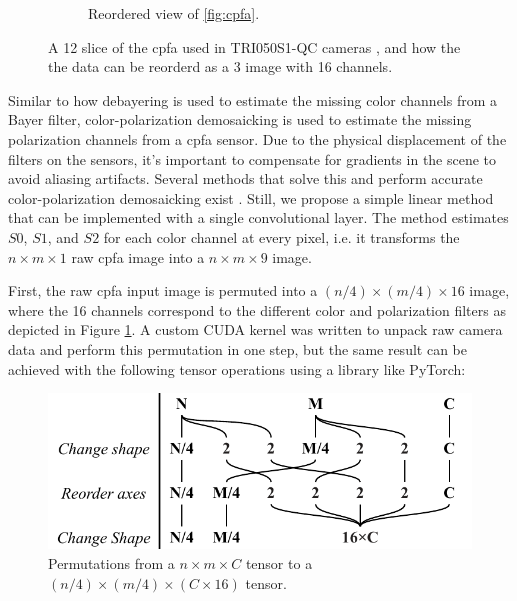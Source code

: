 \begin{figure}[H]
\begin{subfigure}[B]{.48\textwidth}
        \caption{Reordered view of \ref{fig:cpfa}. \label{fig:cpfa_reorder}}
    \end{subfigure}
    \caption{A 12 slice of the \gls{cpfa} used in TRI050S1-QC cameras \cite{lucidvisionlabsTritonMPPolarized2020}, and how the the data can be reorderd as a 3 image with 16 channels. \label{fig:polarization_sensor}}
\end{figure}%

\pagebreak
Similar to how debayering is used to estimate the missing color channels from a Bayer filter, color-polarization demosaicking is used to estimate the missing polarization channels from a \gls{cpfa} sensor.
Due to the physical displacement of the filters on the sensors, it's important to compensate for gradients in the scene to avoid aliasing artifacts.
Several methods that solve this and perform accurate color-polarization demosaicking exist \cite{morimatsuMonochromeColorPolarization2020}\cite{morimatsuMonochromeColorPolarization2021}\cite{nguyenTwoStepColorPolarizationDemosaicking2022a}.
Still, we propose a simple linear method that can be implemented with a single convolutional layer.
The method estimates $S0$, $S1$, and $S2$ for each color channel at every pixel, i.e. it transforms the $n \times m \times 1$ raw \gls{cpfa} image into a $n \times m \times 9$ image.

First, the raw \gls{cpfa} input image is permuted into a $(n/4) \times (m/4) \times 16$ image, where the 16 channels correspond to the different color and polarization filters as depicted in Figure \ref{fig:cpfa_reorder}.
A custom CUDA kernel was written to unpack raw camera data and perform this permutation in one step, but the same result can be achieved with the following tensor operations using a library like PyTorch:
\begin{figure}[H]
    \centering
    \includegraphics[width=.6\textwidth]{figures/transformation.pdf}
    \caption{Permutations from a $n \times m \times C $ tensor to a $(n/4) \times (m/4) \times (C\times 16)$ tensor. \label{fig:reorder_operations}}
    
\end{figure}%

